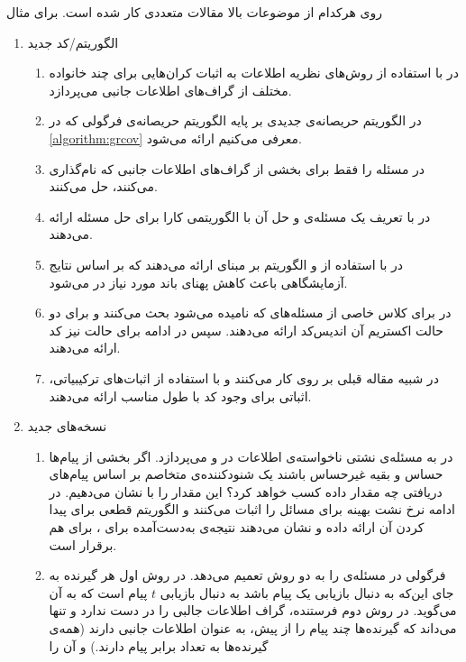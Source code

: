  روی هرکدام از موضوعات بالا مقالات متعددی کار شده است. برای مثال
 \begin{enumerate}
 	\item الگوریتم‌/کد جدید
 	\begin{enumerate}
 		\item 
 		 در
 		\cite{8278015}
 		با استفاده از روش‌های نظریه اطلاعات به اثبات کران‌هایی برای چند خانواده مختلف از گراف‌های اطلاعات جانبی می‌پردازد.
 		\item 
 		در
 		\cite{10313405}
 		الگوریتم حریصانه‌ی جدیدی بر پایه الگوریتم حریصانه‌ی فرگولی که در
   \autoref{algorithm:grcov}
   معرفی می‌کنیم ارائه می‌شود.
 		\item
 		در
 		\cite{8871209}
 		مسئله را فقط برای بخشی از گراف‌های اطلاعات جانبی که
 		نام‌گذاری می‌کنند، حل می‌کنند.
 		\item
 		در
 		\cite{9759449}
 		با تعریف یک مسئله‌ی
 		و حل آن با 
 		الگوریتمی کارا برای حل مسئله ارائه می‌دهند.
 		\item
 		در
 		\cite{8682270}
 		با استفاده از
 		\picod
 		و الگوریتم بر مبنای
 		ارائه می‌دهند که بر اساس نتایج آزمایشگاهی باعث کاهش پهنای باند مورد نیاز در
 		می‌شود.
 		\item
 		در
 		\cite{sasi2019pliable}
 		برای کلاس خاصی از مسئله‌‌های
 		\picod
 		که
 		نامیده می‌شود بحث می‌کنند و برای دو حالت اکستریم آن اندیس‌کد ارائه می‌دهند. سپس در ادامه برای حالت
 		نیز کد ارائه می‌دهند.
 		\item 
 		در
 		\cite{8613483}
 		شبیه مقاله قبلی بر روی
 		کار می‌کنند و با استفاده از اثبات‌های ترکیبیاتی، اثباتی برای وجود کد با طول مناسب ارائه می‌دهند.
 	\end{enumerate}
 	\item نسخه‌های جدید
 	\begin{enumerate}
 		\item
 		 در
 		\cite{10015670}
 		به مسئله‌ی نشتی ناخواسته‌ی اطلاعات در
 		\icod
 		و
 		\picod
 		می‌پردازد. اگر بخشی از پیام‌ها حساس و بقیه غیرحساس باشند یک شنودکننده‌ی متخاصم بر اساس پیام‌های دریافتی چه مقدار داده کسب خواهد کرد؟ این مقدار را با
 		نشان می‌دهیم. در ادامه نرخ نشت بهینه برای مسائل
 		\icod
 	را اثبات می‌کنند و الگوریتم قطعی برای پیدا کردن آن ارائه داده و نشان می‌دهند نتیجه‌ی به‌دست‌آمده برای
 		\icod،
 		برای
 		\picod
 		هم برقرار است.
 		\item 
 		فرگولی در
 		\cite{6620405}
 		مسئله‌ی
 		\picod
 		را به دو روش تعمیم می‌دهد. در روش اول هر گیرنده به جای این‌که به دنبال بازیابی یک پیام باشد به دنبال بازیابی
 		$t$
 		پیام است که به آن
 		می‌گوید.
 		در روش دوم فرستنده، گراف اطلاعات جالبی را در دست ندارد و تنها می‌داند که گیرنده‌ها چند پیام را از پیش، به عنوان اطلاعات جانبی دارند (همه‌ی گیرنده‌ها به تعداد برابر پیام دارند.) و آن را
 		

\end{enumerate}
\end{enumerate}
